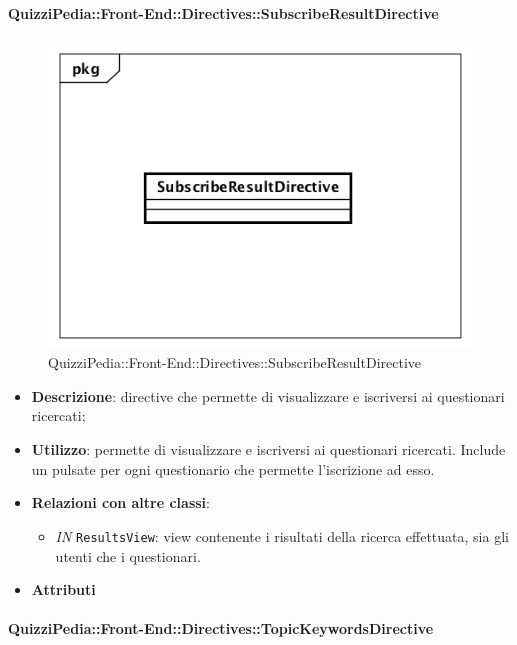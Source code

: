 \paragraph{QuizziPedia::Front-End::Directives::SubscribeResultDirective }

\label{QuizziPedia::Front-End::Directives::SubscribeResultDirective}

\begin{figure}[h]
	\centering
	\includegraphics[scale=0.5,keepaspectratio]{UML/Classi/Front-End/QuizziPedia_Front-end_Directives_SubscribeResultDirective.png}
	\caption{QuizziPedia::Front-End::Directives::SubscribeResultDirective}
\end{figure}

\begin{itemize}
	\item \textbf{Descrizione}: directive che permette di visualizzare e iscriversi ai questionari ricercati;
	\item \textbf{Utilizzo}: permette di visualizzare e iscriversi ai questionari ricercati. Include un pulsate per ogni questionario che permette l'iscrizione ad esso.
	\item \textbf{Relazioni con altre classi}:
	\begin{itemize}
		\item \textit{IN} \texttt{ResultsView}: view contenente i risultati della ricerca effettuata, sia gli utenti che i questionari.
	\end{itemize}
	\item \textbf{Attributi}
\end{itemize}

\paragraph{QuizziPedia::Front-End::Directives::TopicKeywordsDirective}

